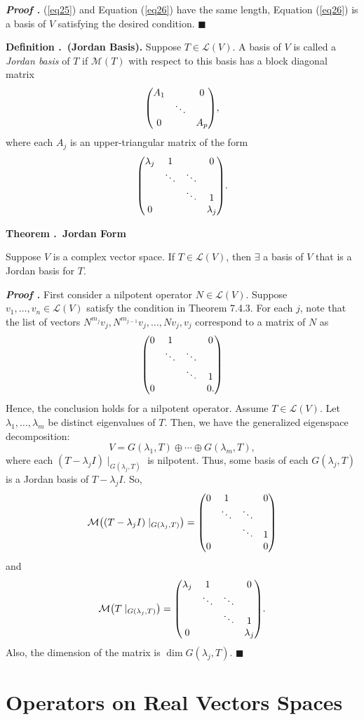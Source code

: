 \documentclass[11pt, letterpaper]{article}
\newcounter{index}[subsection]
\newenvironment*{df}[1]{\par\noindent\textbf{Definition \thesubsection.\stepcounter{index}\theindex\ (#1).}}{\par}
\newenvironment*{thm}[1]{\begin{tcolorbox}\par\noindent\textbf{Theorem \thesubsection.\stepcounter{index}\theindex\ #1} \par}{\par\end{tcolorbox}}
\newcounter{nprf}[subsection]
\newenvironment*{prf}{\par\indent\textbf{\textit{Proof \stepcounter{nprf}\thenprf.}}}{\hfill$\blacksquare$\par}
\def\L{\mathcal{L}}
\def\M{\mathcal{M}}
\begin{document}
\begin{prf}
(\ref{eq25}) and Equation (\ref{eq26}) have the same length, Equation (\ref{eq26}) is a basis of $V$ satisfying the desired condition.
\end{prf}
\begin{df}{Jordan Basis}
	Suppose $T\in\L(V)$. A basis of $V$ is called a \textit{Jordan basis} of $T$ if $\M(T)$ with respect to this basis has a block diagonal matrix \[\mqty(A_1&&0\\&\ddots&\\0&&A_p),\] where each $A_j$ is an upper-triangular matrix of the form \[\mqty(\lambda_j&1&&0\\&\ddots&\ddots&\\&&\ddots&1\\0&&&\lambda_j).\]
\end{df}
\begin{thm}{Jordan Form}
	Suppose $V$ is a complex vector space. If $T\in\L(V)$, then $\exists$ a basis of $V$ that is a Jordan basis for $T$. 
\end{thm}
\begin{prf}
	First consider a nilpotent operator $N\in\L(V)$. Suppose $v_1,\dots,v_n\in\L(V)$ satisfy the condition in Theorem 7.4.3. For each $j$, note that the list of vectors $N^{m_j}v_j,N^{m_{j-1}}v_j,\dots,Nv_j,v_j$ correspond to a matrix of $N$ as \[\mqty(0&1&&0\\&\ddots&\ddots&\\&&\ddots&1\\0&&&0.)\] Hence, the conclusion holds for a nilpotent operator. Assume $T\in\L(V)$. Let $\lambda_1,\dots,\lambda_m$ be distinct eigenvalues of $T$. Then, we have the generalized eigenspace decomposition: \[V=G(\lambda_1,T)\oplus\cdots\oplus G(\lambda_m,T),\] where each $(T-\lambda_jI)\mid_{G(\lambda_j,T)}$ is nilpotent. Thus, some basis of each $G(\lambda_j, T)$ is a Jordan basis of $T-\lambda_jI$. So, \[\M\qty((T-\lambda_jI)\mid_{G(\lambda_j,T)})=\mqty(0&1&&0\\&\ddots&\ddots&\\&&\ddots&1\\0&&&0)\] and \[\M\qty(T\mid_{G(\lambda_j, T)})=\mqty(\lambda_j&1&&0\\&\ddots&\ddots&\\&&\ddots&1\\0&&&\lambda_j).\] Also, the dimension of the matrix is $\dim G(\lambda_j, T)$.
\end{prf}

\newpage
\section{Operators on Real Vectors Spaces}
\end{document}
